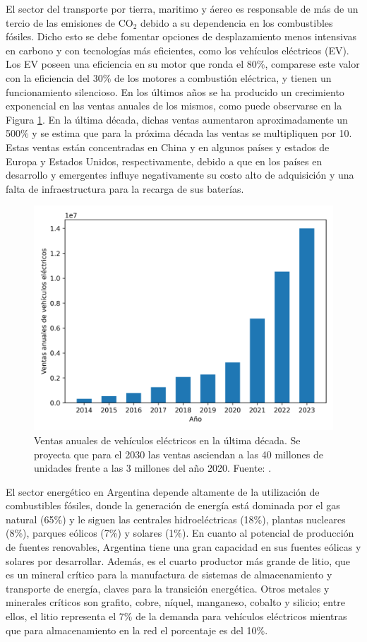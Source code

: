 El sector del transporte por tierra, maritimo y áereo es responsable de más de un 
tercio de las emisiones de CO$_2$ debido a su dependencia en los combustibles 
fósiles. Dicho esto se debe fomentar opciones de desplazamiento menos intensivas
en carbono y con tecnologías más eficientes, como los vehículos eléctricos (EV).
Los EV poseen una eficiencia en su motor que ronda el 80\%, comparese este valor 
con la eficiencia del 30\% de los motores a combustión eléctrica, y tienen un 
funcionamiento silencioso. En los últimos años se ha producido un crecimiento 
exponencial en las ventas anuales de los mismos, como puede observarse en la
Figura \ref{fig:ev-volumes}. En la última década, dichas ventas aumentaron 
aproximadamente un 500\% y se estima que para la próxima década las ventas se 
multipliquen por 10. Estas ventas están concentradas en China y en algunos países
y estados de Europa y Estados Unidos, respectivamente, debido a que en los países
en desarrollo y emergentes influye negativamente su costo alto de adquisición y 
una falta de infraestructura para la recarga de sus baterías.
\begin{figure}[h!]
    \centering
    \includegraphics[width=.8\textwidth]{Introduccion/energia/ev-volumes.png}
    \caption{Ventas anuales de vehículos eléctricos en la última década. Se 
    proyecta que para el 2030 las ventas asciendan a las 40 millones de unidades 
    frente a las 3 millones del año 2020. Fuente: \cite{EVV}.}
    \label{fig:ev-volumes}
\end{figure}

El sector energético en Argentina depende altamente de la utilización de 
combustibles fósiles, donde la generación de energía está dominada por el gas 
natural (65\%) y le siguen las centrales hidroeléctricas (18\%), plantas nucleares
(8\%), parques eólicos (7\%) y solares (1\%). En cuanto al potencial de 
producción de fuentes renovables, Argentina tiene una gran capacidad en sus 
fuentes eólicas y solares por desarrollar. Además, es el cuarto productor más 
grande de litio, que es un mineral crítico para la manufactura de sistemas de 
almacenamiento y transporte de energía, claves para la transición energética. 
Otros metales y minerales críticos son grafito, cobre, níquel, manganeso, cobalto 
y silicio; entre ellos, el litio representa el 7\% de la demanda para vehículos 
eléctricos mientras que para almacenamiento en la red el porcentaje es del 10\%.

